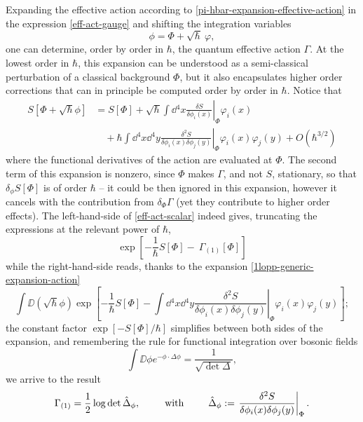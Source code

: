 Expanding the effective action according to \eqref{pi-hbar-expansion-effective-action} in the expression \eqref{eff-act-gauge} and shifting the integration variables
\begin{equation}\label{1lopp-generic-expansion-action-shift}
\phi = \Phi + \sqrt{\hbar}\: \varphi,
\end{equation}
one can determine, order by order in $\hbar$, the quantum effective action $\Gamma$. At the lowest order in $\hbar$, this expansion can be understood as a semi-classical perturbation of a classical background $\Phi$, but it also encapsulates higher order corrections that can in principle be computed order by order in $\hbar$.
Notice that
\begin{equation}\label{1lopp-generic-expansion-action}
\begin{split}
S[\Phi + \sqrt{\hbar} \phi  ] 
	& =
S[\Phi]
 + \sqrt{\hbar} \int \dd{^4x} \left. \frac{\delta S}{\delta \phi_i(x)} \right|_{\Phi} \varphi_i(x)
\\
&
\quad   + \hbar \int \dd{^4 x} \dd{^4 y} \left. \frac{\delta^2 S}{\delta \phi_i(x) \delta \phi_j(y)} \right|_{\Phi} \varphi_i(x)  \varphi_j(y) + O(\hbar^{3/2})
\end{split}
\end{equation}
where the functional derivatives of the action are evaluated at $\Phi$. The second term of this expansion is nonzero, since $\Phi$ makes $\Gamma$, and not $S$, stationary, so that ${\delta_\phi S}[\Phi]$ is of order $\hbar$ -- it could be then ignored in this expansion, however it cancels with the contribution from $\delta_\Phi \Gamma$ (yet they contribute to higher order effects).
The left-hand-side of \eqref{eff-act-scalar} indeed gives, truncating the expressions at the relevant power of $\hbar$,
\begin{equation}
\exp\left[ - \frac{1}{\hbar}  S[\Phi] - \: \Gamma_{(1)}[\Phi]  \right]
\end{equation}
while the right-hand-side reads, thanks to the expansion \eqref{1lopp-generic-expansion-action}
\begin{equation}
\int \DD{( \sqrt{\hbar }\phi) }
\exp\left[
	- \frac{1}{\hbar} 
		S[\Phi] - \int \dd{^4 x} \dd{^4 y} \left. \frac{\delta^2 S}{\delta \phi_i(x) \delta \phi_j(y)} \right|_{\Phi} \varphi_i(x)  \varphi_j(y)
\right];
\end{equation}
the constant factor \(\exp[ -S[\Phi]/\hbar] \) simplifies between both sides of the expansion, and remembering the rule for functional integration over bosonic fields 
\begin{equation}
\int \DD{\phi} e^{- \phi \cdot \Delta \phi} = \frac{1}{\sqrt{ \det \Delta}},
\end{equation}
we arrive to the result
\begin{equation}\label{1loop-generic-gauge+matter}
\Gamma_{(1)}
	=
\frac{1}{2}\log \det \hat \Delta_\phi,
\hspace{2.5em}
\text{with}
\hspace{2.5em}
\hat \Delta_\phi:= \left. \frac{\delta^2 S}{\delta \phi_i(x) \delta \phi_j(y)} \right|_{\Phi}.
\end{equation}

